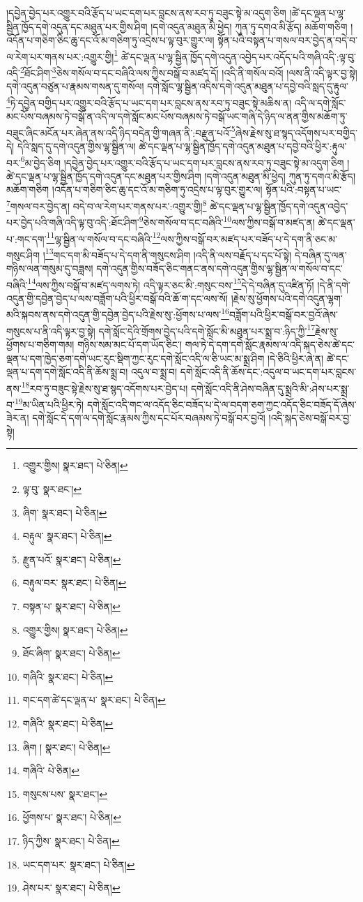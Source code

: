 །དབྱེན་བྱེད་པར་འགྱུར་བའི་རྩོད་པ་ཡང་དག་པར་བླངས་ནས་རབ་ཏུ་བཟུང་སྟེ་མ་འདུག་ཅིག །ཚེ་དང་ལྡན་པ་ལྷ་སྦྱིན་ཁྱོད་དགེ་འདུན་དང་མཐུན་པར་གྱིས་ཤིག །དགེ་འདུན་མཐུན་མི་ཕྱེད། ཀུན་ཏུ་དགའ་མི་རྩོད། མཆོག་གཅིག །འདོན་པ་གཅིག་ཅིང་ཆུ་དང་འོ་མ་གཅིག་ཏུ་འདྲེས་པ་ལྟ་བུར་གྱུར་ལ། སྟོན་པའི་བསྟན་པ་གསལ་བར་བྱེད་ན་བདེ་བ་ལ་རེག་པར་གནས་པར་:འགྱུར་གྱི།\footnote{འགྱུར་གྱིས།  སྣར་ཐང་།  པེ་ཅིན། } ཚེ་དང་ལྡན་པ་ལྷ་སྦྱིན་ཁྱོད་དགེ་འདུན་འབྱེད་པར་འདོད་པའི་གཞི་འདི་:ལྟ་བུ་འདི་\footnote{ལྟ་བུ་  སྣར་ཐང་། }ཐོང་ཤིག་\footnote{ཞིག་  སྣར་ཐང་།  པེ་ཅིན། }ཅེས་གསོལ་བ་དང་བཞིའི་ལས་ཀྱིས་བསྒོ་བ་མཛད་དོ། །འདི་ནི་གསོལ་བའོ། །ལས་ནི་འདི་ལྟར་བྱ་སྟེ། དགེ་འདུན་བཙུན་པ་རྣམས་གསན་དུ་གསོལ། དགེ་སློང་ལྷ་སྦྱིན་འདིས་དགེ་འདུན་མཐུན་པ་དབྱེ་བའི་སླད་དུ་རྟུལ་\footnote{བརྟུལ་  སྣར་ཐང་།  པེ་ཅིན། }ཏེ་དབྱེན་བགྱིད་པར་འགྱུར་བའི་རྩོད་པ་ཡང་དག་པར་བླངས་ནས་རབ་ཏུ་བཟུང་སྟེ་མཆིས་ན། འདི་ལ་དགེ་སློང་མང་པོས་བཞམས་ཏེ་བསྒོ་ན་འདི་ལ་དགེ་སློང་མང་པོས་བཞམས་ཏེ་བསྒོ་ཡང་གཞི་དེ་ཉིད་ལ་ནན་གྱིས་མཆོག་ཏུ་བཟུང་ཞིང་མངོན་པར་ཞེན་ནས་འདི་ཉིད་བདེན་གྱི་གཞན་ནི་:བརྫུན་པའོ་\footnote{རྫུན་པའོ་  སྣར་ཐང་།  པེ་ཅིན། }ཞེས་རྗེས་སུ་ཐ་སྙད་འདོགས་པར་བགྱིད་དེ། དེའི་སླད་དུ་དགེ་འདུན་གྱིས་ལྷ་སྦྱིན་ལ། ཚེ་དང་ལྡན་པ་ལྷ་སྦྱིན་ཁྱོད་དགེ་འདུན་མཐུན་པ་དབྱེ་བའི་ཕྱིར་:རྟུལ་བར་\footnote{བརྟུལ་བར་  སྣར་ཐང་།  པེ་ཅིན། }མ་བྱེད་ཅིག །དབྱེན་བྱེད་པར་འགྱུར་བའི་རྩོད་པ་ཡང་དག་པར་བླངས་ནས་རབ་ཏུ་བཟུང་སྟེ་མ་འདུག་ཅིག །ཚེ་དང་ལྡན་པ་ལྷ་སྦྱིན་ཁྱོད་དགེ་འདུན་དང་མཐུན་པར་གྱིས་ཤིག །དགེ་འདུན་མཐུན་མི་ཕྱེད། ཀུན་ཏུ་དགའ་མི་རྩོད། མཆོག་གཅིག །འདོན་པ་གཅིག་ཅིང་ཆུ་དང་འོ་མ་གཅིག་ཏུ་འདྲེས་པ་ལྟ་བུར་གྱུར་ལ། སྟོན་པའི་:བསྟན་པ་ཡང་\footnote{བསྟན་པ་  སྣར་ཐང་།  པེ་ཅིན། }གསལ་བར་བྱེད་ན། བདེ་བ་ལ་རེག་པར་གནས་པར་:འགྱུར་གྱི།\footnote{འགྱུར་གྱིས།  སྣར་ཐང་།  པེ་ཅིན། } ཚེ་དང་ལྡན་པ་ལྷ་སྦྱིན་ཁྱོད་དགེ་འདུན་འབྱེད་པར་བྱེད་པའི་གཞི་འདི་ལྟ་བུ་འདི་:ཐོང་ཤིག་\footnote{ཐོང་ཞིག་  སྣར་ཐང་།  པེ་ཅིན། }ཅེས་གསོལ་བ་དང་བཞིའི་\footnote{གཞིའི་  སྣར་ཐང་།  པེ་ཅིན། }ལས་ཀྱིས་བསྒོ་བ་མཛད་ན། ཚེ་དང་ལྡན་པ་:གང་དག་\footnote{གང་དག་ཚེ་དང་ལྡན་པ་  སྣར་ཐང་།  པེ་ཅིན། }ལྷ་སྦྱིན་ལ་གསོལ་བ་དང་བཞིའི་\footnote{གཞིའི་  སྣར་ཐང་།  པེ་ཅིན། }ལས་ཀྱིས་བསྒོ་བར་མཛད་པར་བཟོད་པ་དེ་དག་ནི་ཅང་མ་གསུང་ཤིག །\footnote{ཞིག །  སྣར་ཐང་།  པེ་ཅིན། }གང་དག་མི་བཟོད་པ་དེ་དག་ནི་གསུངས་ཤིག །འདི་ནི་ལས་བརྗོད་པ་དང་པོ་སྟེ། དེ་བཞིན་དུ་ལན་གཉིས་ལན་གསུམ་དུ་བཟླས། དགེ་འདུན་གྱིས་བཟོད་ཅིང་གནང་ནས་དགེ་འདུན་གྱིས་ལྷ་སྦྱིན་ལ་གསོལ་བ་དང་བཞིའི་\footnote{གཞིའི་  པེ་ཅིན། }ལས་ཀྱིས་བསྒོ་བ་མཛད་ལགས་ཏེ། འདི་ལྟར་ཅང་མི་:གསུང་བས་\footnote{གསུངས་པས་  སྣར་ཐང་། }དེ་དེ་བཞིན་དུ་འཛིན་ཏོ། །དེ་ནི་དགེ་འདུན་གྱི་དབྱེན་བྱེད་པ་ལས་བཟློག་པའི་ཕྱིར་བསྒོ་བའི་ཆོ་ག་དང་ལས་སོ། །རྗེས་སུ་ཕྱོགས་པའི་དགེ་འདུན་ལྷག་མའི་སྐབས་ནས་དགེ་འདུན་གྱི་དབྱེན་བྱེད་པའི་རྗེས་སུ་:ཕྱོགས་པ་ལས་\footnote{ཕྱོགས་པ་  སྣར་ཐང་།  པེ་ཅིན། }བཟློག་པའི་ཕྱིར་བསྒོ་བར་བྱའོ་ཞེས་གསུངས་པ་ནི་འདི་ལྟར་བྱ་སྟེ། དགེ་སློང་དེའི་གྲོགས་བྱེད་པའི་དགེ་སློང་མི་མཐུན་པར་སྨྲ་བ་:ཉིད་ཀྱི་\footnote{ཉིད་ཀྱིས་  སྣར་ཐང་།  པེ་ཅིན། }རྗེས་སུ་ཕྱོགས་པ་གཅིག་གམ། གཉིས་སམ་མང་པོ་དག་ཡོད་ཅིང་། གལ་ཏེ་དེ་དག་དགེ་སློང་རྣམས་ལ་འདི་སྐད་ཅེས་ཚེ་དང་ལྡན་པ་དག་ཁྱེད་ཅག་དགེ་ཡང་རུང་སྡིག་ཀྱང་རུང་དགེ་སློང་འདི་ལ་ཅི་ཡང་མ་སྨྲ་ཤིག །དེ་ཅིའི་ཕྱིར་ཞེ་ན། ཚེ་དང་ལྡན་པ་དག་དགེ་སློང་འདི་ནི་ཆོས་སྨྲ་བ། འདུལ་བ་སྨྲ་བ། དགེ་སློང་འདི་ནི་ཆོས་དང་:འདུལ་བ་ཡང་དག་པར་བླངས་ནས་\footnote{ཡང་དག་པར་  སྣར་ཐང་།  པེ་ཅིན། }རབ་ཏུ་བཟུང་སྟེ་རྗེས་སུ་ཐ་སྙད་འདོགས་པར་བྱེད་པ། དགེ་སློང་འདི་ནི་ཤེས་བཞིན་དུ་སྨྲའི་མི་:ཤེས་པར་སྨྲ་བ་\footnote{ཤེས་པར་  སྣར་ཐང་།  པེ་ཅིན། }མ་ཡིན་པའི་ཕྱིར་ཏེ། དགེ་སློང་འདི་གང་ལ་འདོད་ཅིང་བཟོད་པ་དེ་ལ་བདག་ཅག་ཀྱང་འདོད་ཅིང་བཟོད་དོ་ཞེས་ཟེར་ན། དགེ་སློང་དེ་དག་ལ་དགེ་སློང་རྣམས་ཀྱིས་དང་པོར་བཞམས་ཏེ་བསྒོ་བར་བྱའོ། །འདི་སྐད་ཅེས་བསྒོ་བར་བྱ་སྟེ། 